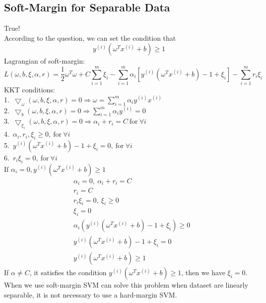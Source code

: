 \documentclass[UTF8]{article}
\begin{document}
\subsection{Soft-Margin for Separable Data}
\noindent True! \\
According to the question, we can set the condition that
$$
y^{(i)}(\omega^Tx^{(i)}+b) \geq 1
$$
Lagrangian of soft-margin:
$$
L(\omega,b,\xi,\alpha,r) = \frac{1}{2}\omega^T\omega + C\sum_{i=1}^m\xi_i - \sum_{i=1}^m\alpha_i[y^{(i)}(\omega^Tx^{(i)}+b)-1+\xi_i] - \sum_{i=1}^m r_i \xi_i
$$
KKT conditions:\\
1.\ $\bigtriangledown_{\omega}(\omega,b,\xi,\alpha,r) = 0 \Rightarrow \omega = \sum_{i=1}^m\alpha_i y^{(i)}x^{(i)}$ \\
2.\ $\bigtriangledown_b(\omega,b,\xi,\alpha,r) = 0 \Rightarrow \sum_{i=1}^m \alpha_iy^{(i)}=0$ \\
3.\ $\bigtriangledown_\xi_i(\omega,b,\xi,\alpha,r) = 0 \Rightarrow \alpha_i + r_i = C \ \text{for} \ \forall i$ \\
4.\ $\alpha_i,r_i,\xi_i \geq 0, \ \text{for} \ \forall i$\\
5.\ $y^{(i)}(\omega^Tx^{(i)}+b)-1+\xi_i=0,\ \text{for} \ \forall i$ \\
6.\ $r_i\xi_i=0, \ \text{for} \ \forall i$ \\
If $\alpha_i = 0, y^{(i)}(\omega^Tx^{(i)}+b) \geq 1$\
\begin{align*}
  &\alpha_i = 0,\ \alpha_i + r_i = C \\
  &r_i = C \\
  &r_i\xi_i = 0,\ \xi_i \geq 0 \\
  &\xi_i = 0\\
  &\alpha_i(y^{(i)}(\omega^Tx^{(i)}+b)-1+\xi_i) \geq 0\\
  & y^{(i)}(\omega^Tx^{(i)}+b)-1+\xi_i = 0\\
  &y^{(i)}(\omega^Tx^{(i)}+b) \geq 1
\end{align*}
If $\alpha \neq C$, it satisfies the condition $ y^{(i)}(\omega^Tx^{(i)}+b) \geq 1$, then we have $\xi_i = 0$.
When we use soft-margin SVM can solve this problem when dataset are linearly separable, it is not necessary to use a hard-margin SVM.
\end{document}
